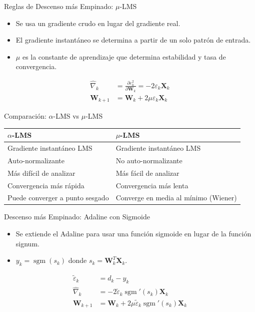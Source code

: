 \documentclass[aspectratio=169,utf8,spanish]{beamer}
\DeclareMathOperator{\sgm}{sgm}
\begin{document}
\begin{frame}{Reglas de Descenso más Empinado: $\mu$-LMS}
  \begin{itemize}
    \item Se usa un gradiente crudo en lugar del gradiente real.
    \item El gradiente instantáneo se determina a partir de un solo patrón de entrada.
    \item $\mu$ es la constante de aprendizaje que determina estabilidad y tasa de convergencia.
  \end{itemize}
  \begin{align*}
    \hat{\nabla}_k &= \frac{\partial \varepsilon_k^2}{\partial \mathbf{W}_k} = -2\varepsilon_k \mathbf{X}_k \\
    \mathbf{W}_{k+1} &= \mathbf{W}_k + 2\mu\varepsilon_k \mathbf{X}_k
  \end{align*}
\end{frame}

\begin{frame}{Comparación: $\alpha$-LMS vs $\mu$-LMS}
  \begin{center}
    \begin{tabular}{ll}
      \toprule
      \textbf{$\alpha$-LMS} & \textbf{$\mu$-LMS} \\
      \midrule
      Gradiente instantáneo LMS & Gradiente instantáneo LMS \\
      Auto-normalizante & No auto-normalizante \\
      Más difícil de analizar & Más fácil de analizar \\
      Convergencia más rápida & Convergencia más lenta \\
      Puede converger a punto sesgado & Converge en media al mínimo (Wiener) \\
      \bottomrule
    \end{tabular}
  \end{center}
\end{frame}

\begin{frame}{Descenso más Empinado: Adaline con Sigmoide}
  \begin{itemize}
    \item Se extiende el Adaline para usar una función sigmoide en lugar de la función signum.
    \item $y_k = \sgm(s_k)$ donde $s_k = \mathbf{W}_k^T \mathbf{X}_k$.
  \end{itemize}
  \begin{align*}
    \tilde{\varepsilon}_k &= d_k - y_k \\
    \hat{\nabla}_k &= -2\tilde{\varepsilon}_k \sgm'(s_k) \mathbf{X}_k \\
    \mathbf{W}_{k+1} &= \mathbf{W}_k + 2\mu\tilde{\varepsilon}_k \sgm'(s_k) \mathbf{X}_k
  \end{align*}
\end{frame}
\end{document}

